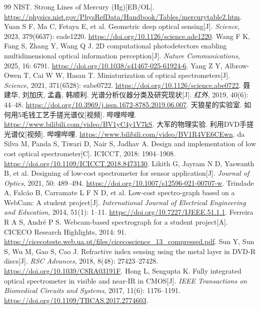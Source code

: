 \documentclass[UTF8,a4paper,12pt]{ctexart}
\begin{document}
\begin{thebibliography}{99}
 NIST. Strong Lines of Mercury (Hg)[EB/OL]. \url{https://physics.nist.gov/PhysRefData/Handbook/Tables/mercurytable2.htm}.
 Yuan S F, Ma C, Fetaya E, et al. Geometric deep optical sensing[J]. \textit{Science}, 2023, 379(6637): eade1220. \url{https://doi.org/10.1126/science.ade1220}.
 Wang F K, Fang S, Zhang Y, Wang Q J. 2D computational photodetectors enabling multidimensional optical information perception[J]. \textit{Nature Communications}, 2025, 16: 6791. \url{https://doi.org/10.1038/s41467-025-61924-6}.
 Yang Z Y, Albrow-Owen T, Cai W W, Hasan T. Miniaturization of optical spectrometers[J]. \textit{Science}, 2021, 371(6528): eabe0722. \url{https://doi.org/10.1126/science.abe0722}.
 聂建华, 刘加庆, 孟鑫, 韩顺利. 光谱分析仪器分类及研究现状[J]. \textit{红外}, 2019, 40(6): 44--48. \url{https://doi.org/10.3969/j.issn.1672-8785.2019.06.007}.
 天狼星的实验室. 如何用5毛钱工艺手搓光谱仪[视频]. 哔哩哔哩. \url{https://www.bilibili.com/video/BV1yC4y1V7kS}.
 大军的物理实验. 利用DVD手搓光谱仪[视频]. 哔哩哔哩. \url{https://www.bilibili.com/video/BV1R4VE6CEwn}.
 da Silva M, Panda S, Tiwari D, Nair S, Jadhav A. Design and implementation of low cost optical spectrometer[C]. ICICCT, 2018: 1904--1908. \url{https://doi.org/10.1109/ICICCT.2018.8473130}.
 Likith G, Jayram N D, Yaswanth B, et al. Designing of low-cost spectrometer for sensor application[J]. \textit{Journal of Optics}, 2021, 50: 489--494. \url{https://doi.org/10.1007/s12596-021-00707-w}.
 Trindade A, Falcão B, Carramate L F N D, et al. Low-cost spectro-graph based on a WebCam: A student project[J]. \textit{International Journal of Electrical Engineering and Education}, 2014, 51(1): 1--11. \url{https://doi.org/10.7227/IJEEE.51.1.1}.
 Ferreira R A S, André P S. Webcam-based spectrograph for a student project[A]. CICECO Research Highlights, 2014: 91. \url{https://cicecoteste.web.ua.pt/files/cicecoscience_13_compressed.pdf}.
 Sun Y, Sun S, Wu M, Gao S, Cao J. Refractive index sensing using the metal layer in DVD-R discs[J]. \textit{RSC Advances}, 2018, 8(48): 27423--27428. \url{https://doi.org/10.1039/C8RA03191F}.
 Hong L, Sengupta K. Fully integrated optical spectrometer in visible and near-IR in CMOS[J]. \textit{IEEE Transactions on Biomedical Circuits and Systems}, 2017, 11(6): 1176--1191. \url{https://doi.org/10.1109/TBCAS.2017.2774603}.

\end{thebibliography}
\end{document}
